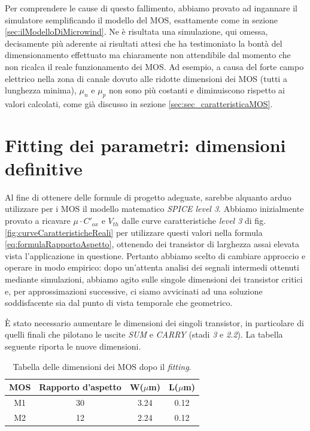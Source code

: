 Per comprendere le cause di questo fallimento, abbiamo provato ad ingannare il simulatore semplificando il modello del MOS, esattamente come in sezione \ref{sec:ilModelloDiMicrowind}. Ne è risultata una simulazione, qui omessa, decisamente più aderente ai risultati attesi che ha testimoniato la bontà del dimensionamento effettuato ma chiaramente non attendibile dal momento che non ricalca il reale funzionamento dei MOS. Ad esempio, a causa del forte campo elettrico nella zona di canale dovuto alle ridotte dimensioni dei MOS (tutti a lunghezza minima), $\mu_n$ e $\mu_p$ non sono più costanti e diminuiscono rispetto ai valori calcolati, come già discusso in sezione \ref{sec:sec_caratteristicaMOS}.



\section{Fitting dei parametri: dimensioni definitive}
\label{sec:sec_fittingParametri}
Al fine di ottenere delle formule di progetto adeguate, sarebbe alquanto arduo utilizzare per i MOS il modello matematico \textit{SPICE level 3}. Abbiamo inizialmente provato a ricavare $\mu \cdot C'_{ox}$ e $V_{th}$ dalle curve caratteristiche \textit{level 3} di fig. \ref{fig:curveCaratteristicheReali} per utilizzare questi valori nella formula \ref{eq:formulaRapportoAspetto}, ottenendo dei transistor di larghezza assai elevata vista l'applicazione in questione.
Pertanto abbiamo scelto di cambiare approccio e operare in modo empirico: dopo un'attenta analisi dei segnali intermedi ottenuti mediante simulazioni, abbiamo agito sulle singole dimensioni dei transistor critici e, per approssimazioni successive, ci siamo avvicinati ad una soluzione soddisfacente sia dal punto di vista temporale che geometrico.

\MakeUppercase{è} stato necessario aumentare le dimensioni dei singoli transistor, in particolare di quelli finali che pilotano le uscite \textit{SUM} e \textit{CARRY} (stadi \textit{3} e \textit{2.2}). La tabella seguente riporta le nuove dimensioni.

\begin{table}[htb]
	\centering
	\begin{tabular}{c*{3}{c}}
		\toprule
		MOS & Rapporto d'aspetto & W($\mu$m) & L($\mu$m)\\
		\midrule
		M1 & 30 & 3.24 & 0.12\\
		M2 & 12 & 2.24 & 0.12\\
		\bottomrule
	\end{tabular}
	\caption{Tabella delle dimensioni dei MOS dopo il \textit{fitting}.}
	\label{tab:dimensioniMosDefinitive}
\end{table}

